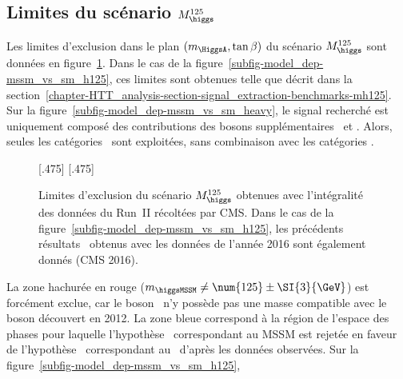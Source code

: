 \subsection{Limites du scénario $M_{\higgs}^{125}$}
Les limites d'exclusion dans le plan $(m_{\HiggsA},\tan\beta)$ du scénario $M_{\higgs}^{125}$
sont données en figure~\ref{fig-model_dep}.
Dans le cas de la figure~\ref{subfig-model_dep-mssm_vs_sm_h125},
ces limites sont obtenues telle que décrit dans la section~\ref{chapter-HTT_analysis-section-signal_extraction-benchmarks-mh125}.
Sur la figure~\ref{subfig-model_dep-mssm_vs_sm_heavy},
le signal recherché est uniquement composé des contributions des bosons supplémentaires \Higgs\ et \HiggsA.
Alors, seules les catégories \CATbsm\ sont exploitées, sans combinaison avec les catégories \CATsm.
\begin{figure}[h]
\centering

[.475\textwidth]
{}
\hfill
{}[.475\textwidth]
{}

\caption[Limites d'exclusion du scénario $M_{\higgs}^{125}$.]{Limites d'exclusion du scénario $M_{\higgs}^{125}$ obtenues avec l'intégralité des données du Run~II récoltées par CMS. Dans le cas de la figure~\ref{subfig-model_dep-mssm_vs_sm_h125}, les précédents résultats~\cite{CMS-PAS-HIG-17-020} obtenus avec les données de l'année 2016 sont également donnés (CMS 2016).}
\label{fig-model_dep}
\end{figure}
\par
La zone hachurée en rouge ($m_{\higgsMSSM}\neq\num{125}\pm\SI{3}{\GeV}$) est forcément exclue,
car le boson \higgsMSSM\ n'y possède pas une masse compatible avec le boson découvert en 2012.
La zone bleue correspond à la région de l'espace des phases pour laquelle
l'hypothèse \hypSB\ correspondant au MSSM
est rejetée en faveur de
l'hypothèse \hypB\ correspondant au \SM\
d'après les données observées.
Sur la figure~\ref{subfig-model_dep-mssm_vs_sm_h125},
